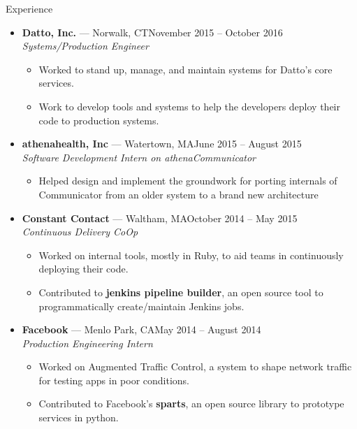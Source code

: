 \documentclass[10pt,oneside]{article}
\newenvironment{ressection}[1]{
	\vspace{3pt}
	{\fontfamily{bch}\selectfont\Large#1}
	\begin{itemize}
	\vspace{2pt}
}{
	\end{itemize}
}
\newcommand{\ressubitem}[1]{
	\vspace{-1pt}
	\item \begin{flushleft} #1 \end{flushleft}
}
\newcommand{\resbigitem}[3]{
	\vspace{-3pt}
	\item
	\textbf{#1} --- #2 \\
	\textit{#3}
}
\newenvironment{ressubsec}[3]{
	\resbigitem{#1}{#2}{#3}
	\vspace{-1pt}
	\begin{itemize}
}{
	\end{itemize}
}
\begin{document}
\begin{ressection}{Experience}

	\begin{ressubsec}{Datto, Inc.}{Norwalk, CT\hfill November 2015 -- October 2016}{Systems/Production Engineer}
		\ressubitem{Worked to stand up, manage, and maintain systems for Datto's core services.}
		\ressubitem{Work to develop tools and systems to help the developers deploy their code to production systems.}
	\end{ressubsec}
	\begin{ressubsec}{athenahealth, Inc}{Watertown, MA\hfill June 2015 -- August 2015}{Software Development Intern on athenaCommunicator}
		\ressubitem{Helped design and implement the groundwork for porting internals of Communicator from an older system to a brand new architecture}
	\end{ressubsec}
	\begin{ressubsec}{Constant Contact}{Waltham, MA\hfill October 2014 -- May 2015}{Continuous Delivery CoOp}
		\ressubitem{Worked on internal tools, mostly in Ruby, to aid teams in continuously deploying their code.}
		\ressubitem{Contributed to \textbf{jenkins pipeline builder}, an open source tool to programmatically create/maintain Jenkins jobs.}
	\end{ressubsec}
	\begin{ressubsec}{Facebook}{Menlo Park, CA\hfill May 2014 -- August 2014}{Production Engineering Intern}
		\ressubitem{Worked on Augmented Traffic Control, a system to shape network traffic for testing apps in poor conditions.}
		\ressubitem{Contributed to Facebook's \textbf{sparts}, an open source library to prototype services in python.}
	\end{ressubsec}

\end{ressection}
\end{document}
